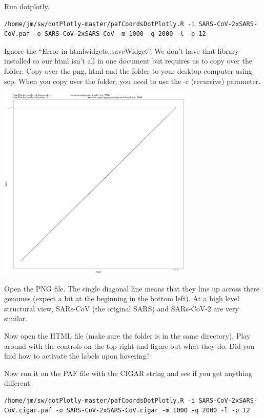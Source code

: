 \documentclass[
]{book}
\begin{document}
Run dotplotly.

\begin{verbatim}
/home/jm/sw/dotPlotly-master/pafCoordsDotPlotly.R -i SARS-CoV-2xSARS-CoV.paf -o SARS-CoV-2xSARS-CoV -m 1000 -q 2000 -l -p 12
\end{verbatim}

Ignore the ``Error in htmlwidgets::saveWidget''. We don't have that library installed so our html isn't all in one document but requires us to copy over the folder. Copy over the png, html and the folder to your desktop computer using scp. When you copy over the folder, you need to use the -r (recursive) parameter.

\includegraphics[width=0.7\textwidth,height=\textheight]{./Figures/SARS-CoV-2xSARS-CoV.png}

Open the PNG file. The single diagonal line means that they line up across there genomes (expect a bit at the beginning in the bottom left). At a high level structural view, SARs-CoV (the original SARS) and SARs-CoV-2 are very similar.

Now open the HTML file (make sure the folder is in the same directory). Play around with the controls on the top right and figure out what they do. Did you find how to activate the labels upon hovering?

Now run it on the PAF file with the CIGAR string and see if you get anything different.

\begin{verbatim}
/home/jm/sw/dotPlotly-master/pafCoordsDotPlotly.R -i SARS-CoV-2xSARS-CoV.cigar.paf -o SARS-CoV-2xSARS-CoV.cigar -m 1000 -q 2000 -l -p 12
\end{verbatim}
\end{document}
